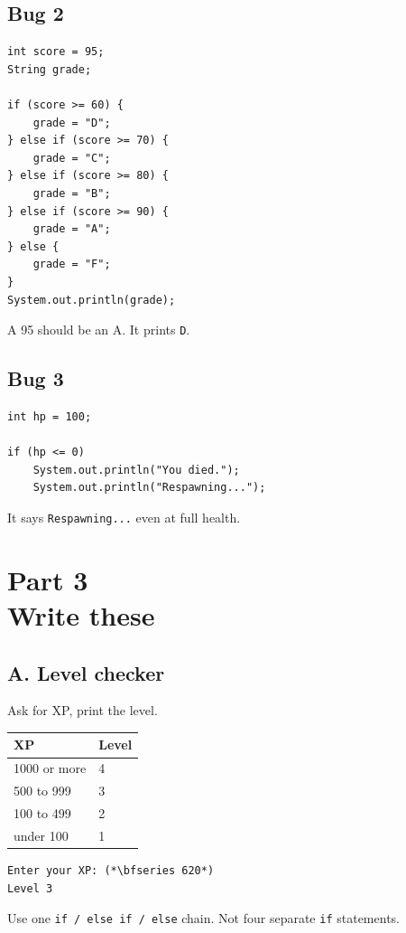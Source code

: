 \documentclass[11pt]{article}
\newcommand{\parttag}[1]{{\sffamily\footnotesize\color{arcane}#1}\\[1pt]}
\newcommand{\code}[1]{\texttt{#1}}
\begin{document}
\subsection*{Bug 2}
\begin{lstlisting}
int score = 95;
String grade;

if (score >= 60) {
    grade = "D";
} else if (score >= 70) {
    grade = "C";
} else if (score >= 80) {
    grade = "B";
} else if (score >= 90) {
    grade = "A";
} else {
    grade = "F";
}
System.out.println(grade);
\end{lstlisting}
A 95 should be an A. It prints \code{D}.

\subsection*{Bug 3}
\begin{lstlisting}
int hp = 100;

if (hp <= 0)
    System.out.println("You died.");
    System.out.println("Respawning...");
\end{lstlisting}
It says \code{Respawning...} even at full health.


\section{\parttag{Part 3}Write these}

\subsection*{A. Level checker}

Ask for XP, print the level.

\vspace{2pt}
{\sffamily\small
\begin{tabular}{@{}ll@{}}
\toprule
XP & Level \\
\midrule
1000 or more & 4 \\
500 to 999 & 3 \\
100 to 499 & 2 \\
under 100 & 1 \\
\bottomrule
\end{tabular}}

\begin{lstlisting}[style=term]
Enter your XP: (*\bfseries 620*)
Level 3
\end{lstlisting}

Use one \code{if / else if / else} chain. Not four separate \code{if} statements.
\end{document}
